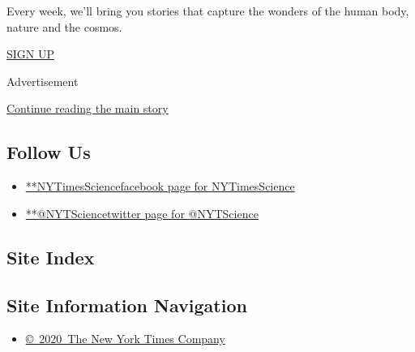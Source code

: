 Every week, we'll bring you stories that capture the wonders of the
human body, nature and the cosmos.

\href{/newsletters/signup/SC}{SIGN UP}

Advertisement

\protect\hyperlink{after-mktg}{Continue reading the main story}

\hypertarget{follow-us}{%
\subsection{Follow Us}\label{follow-us}}

\begin{itemize}
\tightlist
\item
  \href{https://www.facebookcorewwwi.onion/NYTimesScience}{**NYTimesSciencefacebook
  page for NYTimesScience}
\item
  \href{https://twitter.com/NYTScience}{**@NYTSciencetwitter page for
  @NYTScience}
\end{itemize}

\hypertarget{site-index}{%
\subsection{Site Index}\label{site-index}}

\hypertarget{site-information-navigation}{%
\subsection{Site Information
Navigation}\label{site-information-navigation}}

\begin{itemize}
\tightlist
\item
  \href{https://help.nytimes3xbfgragh.onion/hc/en-us/articles/115014792127-Copyright-notice}{©~2020~The
  New York Times Company}
\end{itemize}

